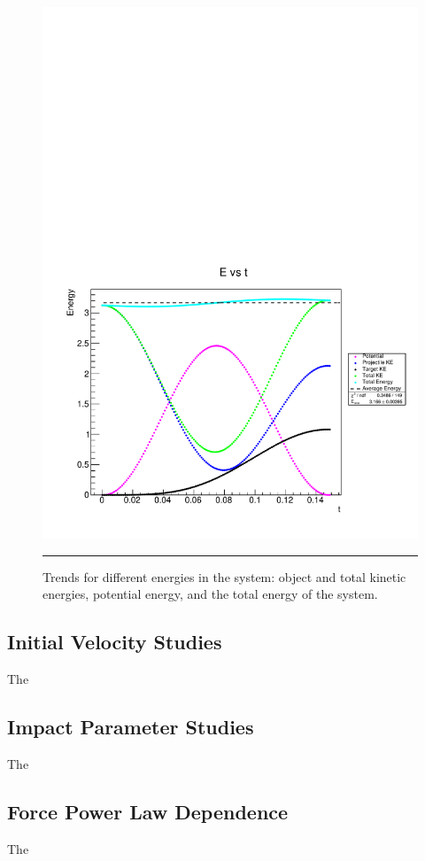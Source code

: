 \documentclass[aps,prl,floatfix,preprint,nofootinbib]{revtex4}
\begin{document}
\begin{figure}
  \includegraphics[width=.8\textwidth]{../diff_system_plots/default/E_vs_t.pdf}
  {\par\nobreak\rule[9pt]{35em}{0.5pt}\vspace{-5mm}}
  \caption{Trends for different energies in the system: object and total kinetic energies, potential energy, and the total energy of the system.}
\end{figure}

\subsection{Initial Velocity Studies}
The

\subsection{Impact Parameter Studies}
The

\subsection{Force Power Law Dependence}
The
\end{document}
